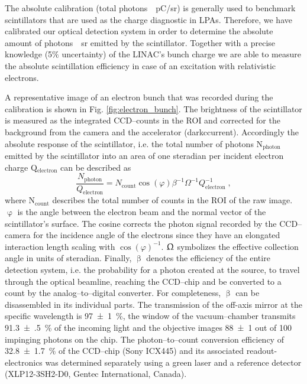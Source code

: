 \documentclass[%
reprint,
amsmath,
amssymb,
aip,
rsi, 
numerical,
floatfix,
]{revtex4-1}
\begin{document}
The absolute calibration (total \si[per-mode=symbol]{photons \per \pico \coulomb \per \steradian}) is generally used to benchmark scintillators that are used as the charge diagnostic in LPAs.  
Therefore, we have calibrated our optical detection system in order to determine the absolute amount of \si[per-mode=symbol]{photons \per \steradian} emitted by the scintillator.
Together with a precise knowledge (5$\%$ uncertainty) of the LINAC's bunch charge we are able to measure the absolute scintillation efficiency in case of an excitation with relativistic electrons.

A representative image of an electron bunch that was recorded during the calibration is shown in Fig. \ref{fig:electron_bunch}. 
The brightness of the scintillator is measured as the integrated CCD--counts in the ROI and corrected for the background from the camera and the accelerator (darkccurrent). 
Accordingly the absolute response of the scintillator, i.e. the total number of photons N$_{\text{photon}}$ emitted by the scintillator into an area of one steradian per incident electron charge Q$_{\text{electron}}$ can be described as
\begin{equation}
\frac{N_{\text{photon}}}{Q_{\text{electron}}} = N_{\text{count}}\cos(\varphi)\beta^{-1}\Omega^{-1}Q_{\text{electron}}^{-1}{\;,}
\label{eq:ac}
\end{equation}
where N$_{\text{count}}$ describes the total number of counts in the ROI of the raw image.
$\upvarphi$ is the angle between the electron beam and the normal vector of the scintillator's surface.
The cosine corrects the photon signal recorded by the CCD--camera for the incidence angle of the electrons since they have an elongated interaction length scaling with $\cos(\varphi)^{-1}$.
$\Upomega$ symbolizes the effective collection angle in units of steradian.
Finally, $\upbeta$ denotes the efficiency of the entire detection system, i.e. the probability for a photon created at the source, to travel through the optical beamline, reaching the CCD--chip and be converted to a count by the analog--to--digital converter.
For completeness, $\upbeta$ can be disassembled in its individual parts. 
The transmission of the off-axis mirror at the specific wavelength is \SI[separate-uncertainty = true]{97(1)}{\%}, the window of the vacuum--chamber transmits \SI[separate-uncertainty = true]{91.3(5)}{\%} of the incoming light and the objective images \num[separate-uncertainty = true]{88(1)} out of 100 impinging photons on the chip.
The photon--to--count conversion efficiency of \SI[separate-uncertainty = true]{32.8(17)}{\%} of the CCD--chip (Sony ICX445) and its associated readout-electronics was determined separately using a green laser and a reference detector (XLP12-3SH2-D0, Gentec International, Canada).
\end{document}
